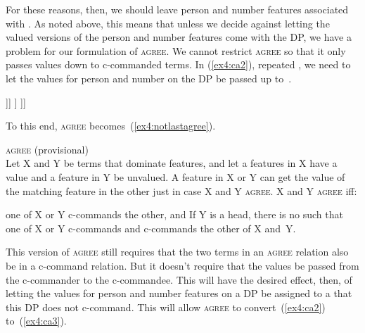 For these reasons, then, we should leave person and number features associated with . As noted above, this means that unless we decide against letting the valued versions of the person and number features come with the DP, we have a problem for our formulation of \textsc{agree}. We cannot restrict \textsc{agree} so that it only passes values down to c-commanded terms. In (\ref{ex4:ca2}), repeated , we need to let the values for person and number on the DP be passed up to~.
\begin{exe}
 \label{ex4:ca2a}
\small
\begin{forest}
[TP[\ibar{T}
	[\obar{T}\\ $\bullet$person:\\$\bullet$number:\\ case: \emph{nom}\\ tense: \emph{pres} ]
	[VP 
		[DP\\ person: \emph{\nth{3}}\\ number: \emph{sing}\\ case: ]
		[\ibar{V} [\obar{V}\\ person:\\number:\\tense: [run]]]
	]
]]
\end{forest}
\end{exe}
\pagebreak
To this end, \textsc{agree} becomes~(\ref{ex4:notlastagree}).
\begin{exe}
\ex \label{ex4:notlastagree} \textsc{agree} (provisional)\\
Let X and Y be terms that dominate features, and let a features in X have a value and a feature in Y be unvalued. A feature in X or Y can get the value of the matching feature in the other just in case X and Y \textsc{agree}. X and Y \textsc{agree} iff:
\begin{xlist}
	\ex one of X or Y c-commands the other, and
	\ex If Y is a head, there is no  such that one of X or Y c-commands  and  c-commands the other of X and~Y.
\end{xlist}
\end{exe}
This version of \textsc{agree} still requires that the two terms in an \textsc{agree} relation also be in a c-command relation. But it doesn't require that the values be passed from the c-commander to the c-commandee. This will have the desired effect, then, of letting the values for person and number features on a DP be assigned to a  that this DP does not c-command. This will allow \textsc{agree} to convert~(\ref{ex4:ca2}) to~(\ref{ex4:ca3}).
